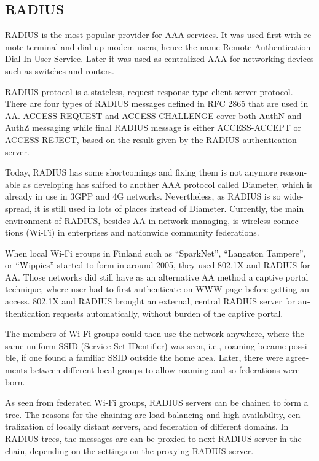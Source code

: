 \documentclass[12pt,a4paper,english]{tutthesis}
\begin{document}
\begin{otherlanguage}{english}
\section{RADIUS}
\label{sec-2-2}
\label{sec:radius}
RADIUS is the most popular provider for 
AAA-services\cite[p.75]{radius-popular}.  It was used first with remote terminal
and dial-up modem users, hence the name Remote Authentication Dial-In
User Service. Later it was used as centralized AAA for networking
devices such as switches and routers.  










RADIUS protocol is a stateless, request-response type client-server
protocol. 
There are four types of RADIUS messages defined in RFC 2865 that are
used in AA. ACCESS-REQUEST and ACCESS-CHALLENGE cover both AuthN and
AuthZ messaging while final RADIUS message is either
ACCESS-ACCEPT or ACCESS-REJECT, based on the
result given by the RADIUS authentication server.

Today, RADIUS has some shortcomings and fixing them is not anymore
reasonable as developing has shifted to another AAA protocol called
Diameter, which is already in use in 3GPP and 4G
networks\cite{diameter}.  Nevertheless, as RADIUS is so wide-spread,
it is still used in lots of places instead of Diameter.  Currently,
the main environment of RADIUS, besides AA in network managing, is wireless
connections (Wi-Fi) in enterprises and nationwide community
federations.


When local Wi-Fi groups in Finland such as ``SparkNet'', ``Langaton
Tampere'', or ``Wippies'' started to form in around 2005, they used
802.1X and RADIUS for AA. Those networks did still have as an
alternative AA method a captive portal technique, where user had to
first authenticate on WWW-page before getting an access.  802.1X and
RADIUS brought an external, central RADIUS server for authentication
requests automatically, without burden of the captive portal.

The members of Wi-Fi groups could then use the network anywhere, where
the same uniform SSID (Service Set IDentifier) was seen, i.e., roaming
became possible, if one found a familiar SSID outside the home area.
Later, there were agreements between different local groups to allow
roaming and so federations were born.

As seen from federated Wi-Fi groups, RADIUS servers can be chained to
form a tree. The reasons for the chaining are load balancing and high
availability, centralization of locally distant servers, and
federation of different domains. In RADIUS trees, the messages are
can be proxied to next RADIUS server in the chain, depending on the settings
on the proxying RADIUS server.



\end{otherlanguage}
\end{document}
